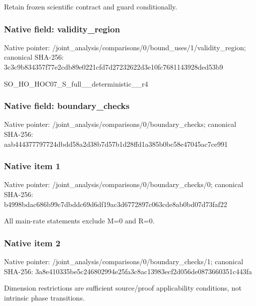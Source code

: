 \documentclass[10pt,a4paper]{article}
\begin{document}
\begingroup\raggedright\sloppy Retain frozen scientific contract and guard conditionally.\par\endgroup

\subsubsection{Native field: validity\_\allowbreak{}region}
Native pointer: /joint\_\allowbreak{}analysis/comparisons/0/bound\_\allowbreak{}uses/1/validity\_\allowbreak{}region; canonical SHA-256: 3c3c9b834357f77e2cdb89e0221cfd7d27232622d3e10fc7681143928ded53b9

\begingroup\raggedright\sloppy SO\_\allowbreak{}HO\_\allowbreak{}HOC07\_\allowbreak{}S\_\allowbreak{}full\_\allowbreak{}\_\allowbreak{}deterministic\_\allowbreak{}\_\allowbreak{}r4\par\endgroup

\subsubsection{Native field: boundary\_\allowbreak{}checks}
Native pointer: /joint\_\allowbreak{}analysis/comparisons/0/boundary\_\allowbreak{}checks; canonical SHA-256: aab444377797724dbdd58a2d38b7d57b1d28ffd1a385b0bc58e47045ac7ce991

\subsubsection{Native item 1}
Native pointer: /joint\_\allowbreak{}analysis/comparisons/0/boundary\_\allowbreak{}checks/0; canonical SHA-256: b4998bdac686b99c7dbddc69d6df19ac3d6772897c063cde8ab0bd07d73faf22

\begingroup\raggedright\sloppy All main-rate statements exclude M=\allowbreak{}0 and R=\allowbreak{}0.\par\endgroup

\subsubsection{Native item 2}
Native pointer: /joint\_\allowbreak{}analysis/comparisons/0/boundary\_\allowbreak{}checks/1; canonical SHA-256: 3a8e410335be5c246802994e25fa3c8ac13983ecf2d056de0873660351c443fa

\begingroup\raggedright\sloppy Dimension restrictions are sufficient source/\allowbreak{}proof applicability conditions,\allowbreak{} not intrinsic phase transitions.\par\endgroup
\end{document}
